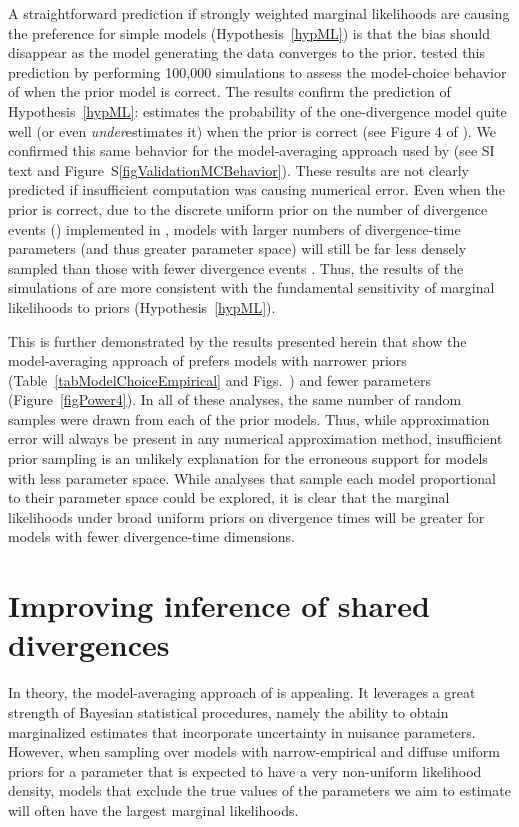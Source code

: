 A straightforward prediction if strongly weighted marginal likelihoods are
causing the preference for simple models (Hypothesis~\ref{hypML}) is that the
bias should disappear as the model generating the data converges to the prior.
\citet{Oaks2012} tested this prediction by performing 100,000 simulations to
assess the model-choice behavior of \msb when the prior model is correct.
The results confirm the prediction of Hypothesis~\ref{hypML}:
\msb estimates the probability of the one-divergence model quite well (or even
\emph{under}estimates it) when the prior is correct (see Figure 4 of
\citet{Oaks2012}).
We confirmed this same behavior for the model-averaging approach used by
\citet{Hickerson2013} (see SI text and Figure~S\ref{figValidationMCBehavior}).
These results are not clearly predicted if insufficient computation was causing
numerical error.
Even when the prior is correct, due to the discrete uniform prior on the number
of divergence events (\numt{}) implemented in \msb, models with larger numbers
of divergence-time parameters (and thus greater parameter space) will still be
far less densely sampled than those with fewer divergence events
\citep{Oaks2012}.
Thus, the results of the simulations of \citet{Oaks2012} are more consistent
with the fundamental sensitivity of marginal likelihoods to priors
(Hypothesis~\ref{hypML}).

This is further demonstrated by the results presented herein that show the
model-averaging approach of \citet{Hickerson2013} prefers models with narrower
\divt{} priors (Table~\ref{tabModelChoiceEmpirical} and
Figs.~)
and fewer \divt{} parameters (Figure~\ref{figPower4}).
In all of these analyses, the same number of random samples were drawn from
each of the prior models.
Thus, while approximation error will always be present in any numerical
approximation method, insufficient prior sampling is an unlikely explanation
for the erroneous support for models with less parameter space.
While analyses that sample each model proportional to their parameter space
could be explored, it is clear that the marginal likelihoods under broad
uniform priors on divergence times will be greater for models with fewer
divergence-time dimensions.




\section{Improving inference of shared divergences}
In theory, the model-averaging approach of \citet{Hickerson2013} is appealing.
It leverages a great strength of Bayesian statistical procedures, namely the
ability to obtain marginalized estimates that incorporate uncertainty in
nuisance parameters.
However, when sampling over models with narrow-empirical and diffuse uniform
priors for a parameter that is expected to have a very non-uniform likelihood
density, models that exclude the true values of the parameters we aim to
estimate will often have the largest marginal likelihoods.

